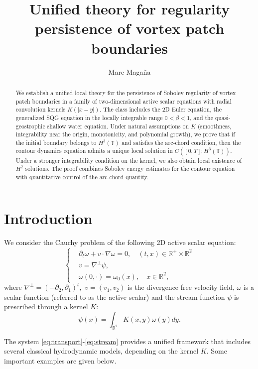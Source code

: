 \documentclass[a4paper]{amsart}
\author{Marc Magaña}
\title{Unified theory for regularity persistence of vortex patch boundaries}
\theoremstyle{definition}
\newcommand{\R}{\ensuremath{\mathbb{R}}}
\begin{document}
\begin{abstract}
We establish a unified local theory for the persistence of Sobolev regularity of
vortex patch boundaries in a family of two-dimensional active scalar equations with
radial convolution kernels \(K(|x-y|)\). The class includes the 2D Euler equation,
the generalized SQG equation in the locally integrable range \(0<\beta<1\), and the
quasi-geostrophic shallow water equation. Under natural assumptions on \(K\)
(smoothness, integrability near the origin, monotonicity, and polynomial growth), we
prove that if the initial boundary belongs to \(H^3(\mathbb T)\) and satisfies the
arc-chord condition, then the contour dynamics equation admits a unique local solution
in \(C([0,T];H^3(\mathbb T))\). Under a stronger integrability condition on the kernel,
we also obtain local existence of \(H^2\) solutions. The proof combines Sobolev energy
estimates for the contour equation with quantitative control of the arc-chord quantity.
\end{abstract}

\maketitle

\section{Introduction}
We consider the Cauchy problem of the following 2D active scalar equation:
\begin{equation}\label{eq:transport}
    \left\{\begin{aligned}
        &\partial_t \omega + v\cdot \nabla \omega=0, \quad (t,x)\in \R^+\times \R^2\\ 
        &v= \nabla^\perp \psi, \\
        &\omega(0,\cdot)=\omega_0(x),\quad x\in \R^2,
    \end{aligned}\right.
\end{equation}
where $\nabla^\perp= (-\partial_2, \partial_1)^t,$ $v=(v_1,v_2)$ is the divergence free velocity field, $\omega$ is a scalar function (referred to as the active scalar) and the stream function $\psi$ is prescribed through a kernel $K$:
\begin{equation}\label{eq:stream}
    \psi(x)=\int_{\R^2} K(x,y)\omega(y)dy.
\end{equation}

The system \eqref{eq:transport}-\eqref{eq:stream} provides a unified framework that includes several classical hydrodynamic models, depending on the kernel $K$. Some important examples are given below.
\end{document}
